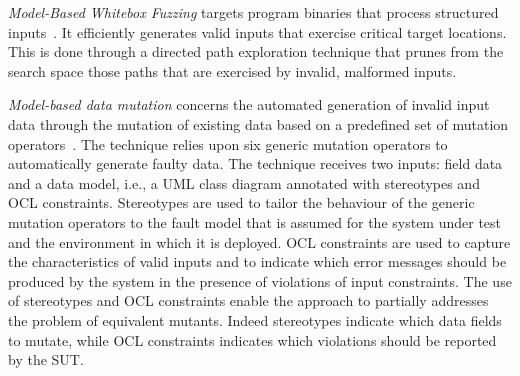 
\emph{Model-Based Whitebox Fuzzing} targets program binaries that process structured inputs~\cite{pham2016model}. It efficiently generates valid inputs that exercise critical target locations. This is done through a directed path exploration technique that prunes from the search space those paths that are exercised by invalid, malformed inputs.

\emph{Model-based data mutation} concerns the automated generation of invalid input data through the mutation of existing data based on a predefined set of mutation operators~\cite{di2015generating}.
The technique relies upon six generic mutation operators to automatically generate faulty data. The technique receives two inputs: field data and a data model, i.e., a UML class diagram annotated with stereotypes and OCL constraints. Stereotypes are used to tailor the behaviour of the generic mutation operators to the fault model that is assumed for the system under test and the environment in which it is deployed. 
OCL constraints are used to capture the characteristics of valid inputs and to indicate which error messages should be produced by the system in the presence of violations of input constraints.
The use of stereotypes and OCL constraints enable the approach to partially addresses the problem of equivalent mutants. Indeed stereotypes indicate which data fields to mutate, while OCL constraints indicates which violations should be reported by the SUT.

